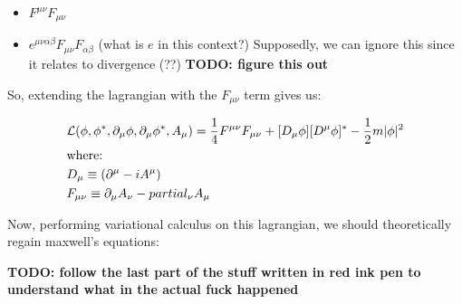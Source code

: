 \begin{itemize}
    \item $F^{\mu \nu} F_{\mu \nu}$
    \item $e^{\mu \nu \alpha \beta} F_{\mu \nu} F_{\alpha \beta}$ (what is $e$ in this context?)
        Supposedly, we can ignore this since it relates to divergence (??)
        \textbf{TODO: figure this out}
\end{itemize}

So, extending the lagrangian with the $F_{\mu \nu}$ term gives us:

\begin{align*}
    &\mathcal{L} (\phi, \phi^*, \partial_\mu \phi, \partial_\mu \phi^*, A_\mu) =
    \frac{1}{4} F^{\mu \nu} F_{\mu \nu} + [D_\mu \phi][D^\mu \phi]^* - \frac{1}{2} m |\phi|^2 \\
    &\text{where:}\\
    &D_\mu \equiv (\partial^\mu - i A^\mu) \\
    &F_{\mu\nu} \equiv \partial_\mu A_\nu - partial_\nu A_\mu
\end{align*}

Now, performing variational calculus on this lagrangian, we should theoretically
regain maxwell's equations:

\textbf{TODO: follow the last part of the stuff written in red ink pen to
understand what in the actual fuck happened}

